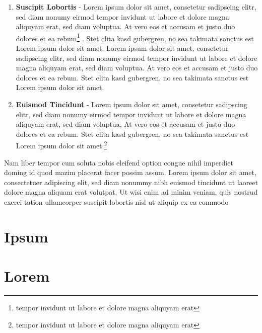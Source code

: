 \documentclass[]{../thesis}
\begin{document}
    \begin{enumerate}
        \item[] \textbf{Suscipit Lobortis} - Lorem ipsum dolor sit amet, consetetur sadipscing elitr, sed diam nonumy eirmod tempor invidunt ut labore et dolore magna aliquyam erat, sed diam voluptua. At vero eos et accusam et justo duo dolores et ea rebum\footnote{tempor invidunt ut labore et dolore magna aliquyam erat} . Stet clita kasd gubergren, no sea takimata sanctus est Lorem ipsum dolor sit amet. Lorem ipsum dolor sit amet, consetetur sadipscing elitr, sed diam nonumy eirmod tempor invidunt ut labore et dolore magna aliquyam erat, sed diam voluptua. At vero eos et accusam et justo duo dolores et ea rebum. Stet clita kasd gubergren, no sea takimata sanctus est Lorem ipsum dolor sit amet.
        \item[] \textbf{Euismod Tincidunt} - Lorem ipsum dolor sit amet, consetetur sadipscing elitr, sed diam nonumy eirmod tempor invidunt ut labore et dolore magna aliquyam erat, sed diam voluptua. At vero eos et accusam et justo duo dolores et ea rebum. Stet clita kasd gubergren, no sea takimata sanctus est Lorem ipsum dolor sit amet.\footnote{tempor invidunt ut labore et dolore magna aliquyam erat}
    \end{enumerate}{}
    
    Nam liber tempor cum soluta nobis eleifend option congue nihil imperdiet doming id quod mazim placerat facer possim assum. Lorem ipsum dolor sit amet, consectetuer adipiscing elit, sed diam nonummy nibh euismod tincidunt ut laoreet dolore magna aliquam erat volutpat. Ut wisi enim ad minim veniam, quis nostrud exerci tation ullamcorper suscipit lobortis nisl ut aliquip ex ea commodo \autocite{STUB}
	    
    \newbib
    
    \begin{appendices}
        \chapter{Ipsum}
        \chapter{Lorem}
    \end{appendices}    
\end{document}
